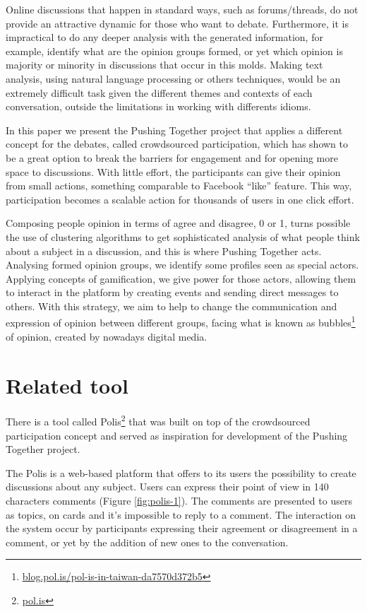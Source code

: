 \documentclass{llncs}
\begin{document}
  Online discussions that happen in standard ways, such as forums/threads, do
not provide an attractive dynamic for those who want to debate. Furthermore, it
is impractical to do any deeper analysis with the generated information, for
example, identify what are the opinion groups formed, or yet which opinion is
majority or minority in discussions that occur in this molds. Making text
analysis, using natural language processing or others techniques, would be an
extremely difficult task given the different themes and contexts of each
conversation, outside the limitations in working with differents idioms.

  In this paper we present the Pushing Together project that applies a
different concept for the debates, called crowdsourced participation, which has
shown to be a great option to break the barriers for engagement and for opening
more space to discussions. With little effort, the participants can give their
opinion from small actions, something comparable to Facebook ``like'' feature.
This way, participation becomes a scalable action for thousands of users in one
click effort.

  Composing people opinion in terms of agree and disagree, 0 or 1, turns
possible the use of clustering algorithms to get sophisticated analysis of what
people think about a subject in a discussion, and this is where Pushing
Together acts.  Analysing formed opinion groups, we identify some profiles seen
as special actors.  Applying concepts of gamification, we give power for those
actors, allowing them to interact in the platform by creating events and
sending direct messages to others. With this strategy, we aim to help to change
the communication and expression of opinion between different groups, facing
what is known as
bubbles\footnote{\url{blog.pol.is/pol-is-in-taiwan-da7570d372b5}} of opinion,
created by nowadays digital media.

\section{Related tool}

  There is a tool called Polis\footnote{\url{pol.is}} that was built on top of
the crowdsourced participation concept and served as inspiration for
development of the Pushing Together project.

  The Polis is a web-based platform that offers to its users the possibility to
create discussions about any subject. Users can express their point of view in
140 characters comments (Figure \ref{fig:polis-1}). The comments are presented
to users as topics, on cards and it's impossible to reply to a comment. The
interaction on the system occur by participants expressing their
agreement or disagreement in a comment, or yet by the addition of new
ones to the conversation.
\end{document}
